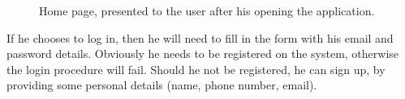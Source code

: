 \begin{figure}%
	\hfill%
	\hfill%
	\caption{Home page, presented to the user after his opening the application.}\label{fig:firstPage}
\end{figure}

\newpage 

If he chooses to log in, then he will need to fill in the form with his email and password details. Obviously he needs to be registered on the system, otherwise the login procedure will fail. Should he not be registered, he can sign up, by providing some personal details (name, phone number, email).

